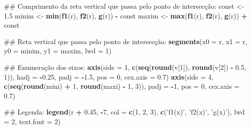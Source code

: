 \documentclass[]{book}
\newenvironment{Shaded}{\begin{snugshade}}{\end{snugshade}}
\newcommand{\KeywordTok}[1]{\textcolor[rgb]{0.13,0.29,0.53}{\textbf{#1}}}
\newcommand{\DataTypeTok}[1]{\textcolor[rgb]{0.13,0.29,0.53}{#1}}
\newcommand{\DecValTok}[1]{\textcolor[rgb]{0.00,0.00,0.81}{#1}}
\newcommand{\FloatTok}[1]{\textcolor[rgb]{0.00,0.00,0.81}{#1}}
\newcommand{\StringTok}[1]{\textcolor[rgb]{0.31,0.60,0.02}{#1}}
\newcommand{\OperatorTok}[1]{\textcolor[rgb]{0.81,0.36,0.00}{\textbf{#1}}}
\newcommand{\NormalTok}[1]{#1}
\begin{document}
\begin{enumerate}
\begin{Shaded}
\begin{Highlighting}[]
\NormalTok{##  Comprimento da reta vertical que passa pelo ponto de intersecção:}
\NormalTok{const <-}\StringTok{ }\FloatTok{1.5}
\NormalTok{minim <-}\StringTok{ }\KeywordTok{min}\NormalTok{(}\KeywordTok{f1}\NormalTok{(r), }\KeywordTok{f2}\NormalTok{(r), }\KeywordTok{g}\NormalTok{(r)) }\OperatorTok{-}\StringTok{ }\NormalTok{const}
\NormalTok{maxim <-}\StringTok{ }\KeywordTok{max}\NormalTok{(}\KeywordTok{f1}\NormalTok{(r), }\KeywordTok{f2}\NormalTok{(r), }\KeywordTok{g}\NormalTok{(r)) }\OperatorTok{+}\StringTok{ }\NormalTok{const}

\NormalTok{##  Reta vertical que passa pelo ponto de intersecção:}
\KeywordTok{segments}\NormalTok{(}\DataTypeTok{x0 =}\NormalTok{ r, }\DataTypeTok{x1 =}\NormalTok{ r,}
     \DataTypeTok{y0 =}\NormalTok{ minim, }\DataTypeTok{y1 =}\NormalTok{ maxim, }\DataTypeTok{lwd =} \DecValTok{1}\NormalTok{)}

\NormalTok{##  Enumeração dos eixos:}
\KeywordTok{axis}\NormalTok{(}\DataTypeTok{side =} \DecValTok{1}\NormalTok{, }\KeywordTok{c}\NormalTok{(}\KeywordTok{seq}\NormalTok{(}\KeywordTok{round}\NormalTok{(v[}\DecValTok{1}\NormalTok{]), }\KeywordTok{round}\NormalTok{(v[}\DecValTok{2}\NormalTok{]) }\OperatorTok{-}\StringTok{ }\FloatTok{0.5}\NormalTok{, }\DecValTok{1}\NormalTok{)),}
 \DataTypeTok{hadj =} \OperatorTok{-}\FloatTok{0.25}\NormalTok{, }\DataTypeTok{padj =} \OperatorTok{-}\FloatTok{1.5}\NormalTok{, }\DataTypeTok{pos =} \DecValTok{0}\NormalTok{, }\DataTypeTok{cex.axis =} \FloatTok{0.7}\NormalTok{)}
\KeywordTok{axis}\NormalTok{(}\DataTypeTok{side =} \DecValTok{4}\NormalTok{, }\KeywordTok{c}\NormalTok{(}\KeywordTok{seq}\NormalTok{(}\KeywordTok{round}\NormalTok{(mini) }\OperatorTok{+}\StringTok{ }\DecValTok{1}\NormalTok{, }\KeywordTok{round}\NormalTok{(maxi) }\OperatorTok{-}\StringTok{ }\DecValTok{1}\NormalTok{, }\DecValTok{3}\NormalTok{)),}
 \DataTypeTok{padj =} \OperatorTok{-}\DecValTok{1}\NormalTok{, }\DataTypeTok{pos =} \DecValTok{0}\NormalTok{, }\DataTypeTok{cex.axis =} \FloatTok{0.7}\NormalTok{)}

\NormalTok{##  Legenda:}
\KeywordTok{legend}\NormalTok{(r }\OperatorTok{+}\StringTok{ }\FloatTok{0.45}\NormalTok{, }\OperatorTok{-}\DecValTok{7}\NormalTok{, }\DataTypeTok{col =} \KeywordTok{c}\NormalTok{(}\DecValTok{1}\NormalTok{, }\DecValTok{2}\NormalTok{, }\DecValTok{3}\NormalTok{), }\KeywordTok{c}\NormalTok{(}\StringTok{'f1(x)'}\NormalTok{, }\StringTok{'f2(x)'}\NormalTok{, }\StringTok{'g(x)'}\NormalTok{),}
   \DataTypeTok{lwd =} \DecValTok{2}\NormalTok{, }\DataTypeTok{text.font =} \DecValTok{2}\NormalTok{)}


\end{Highlighting}
\end{Shaded}
\end{enumerate}
\end{document}

